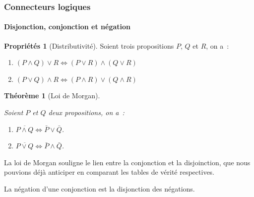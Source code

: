 \documentclass[10pt,notheorems]{beamer}
\theoremstyle{plain}
\newtheorem{theorem}{Théorème}
\theoremstyle{definition} %
\newtheorem{properties}{Propriétés}
\begin{document}
  \begin{frame}
    \frametitle{Connecteurs logiques}
    \framesubtitle{Disjonction, conjonction et négation}
    \hypertarget{slide_disjonction_conjonction_et_negation}{}

    \begin{properties}[Distributivité]\label{properties:distributivite}
    Soient trois propositions $P$, $Q$ et $R$, on a~:
    \begin{enumerate}
    \item $(P\land Q)\lor R \Leftrightarrow (P\lor R) \land (Q\lor R)$
    \item $(P\lor Q)\land R \Leftrightarrow (P\land R) \lor (Q\land R)$
    \end{enumerate}
  \end{properties}

  \bigskip

  \begin{theorem}[Loi de Morgan]\label{theorem:morgan}

    Soient $P$ et $Q$ deux propositions, on a~:
    \begin{enumerate}
    \item $\overline{P \land Q} \Leftrightarrow \bar P \lor \bar Q$.
    \item $\overline{P \lor Q} \Leftrightarrow \bar P \land \bar Q$.
    \end{enumerate}
  \end{theorem}

  \bigskip

  La loi de Morgan souligne le lien entre la conjonction et la disjoinction, que nous pouvions déjà anticiper en comparant les tables de vérité respectives.\newline

  La négation d'une conjonction est la disjonction des négations.

  \end{frame}
\end{document}
